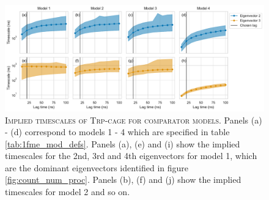 \documentclass{article}
\begin{document}
\begin{figure}[h]
    \centering
    \includegraphics[width=1\textwidth]{figures/model_comparision_its/2jof.pdf}
    \caption{\textsc{Implied timescales of Trp-cage for comparator models.} Panels (a) - (d) correspond to models 1 - 4 which are specified in table \ref{tab:1fme_mod_defs}. Panels (a), (e) and (i) show the implied timescales for the 2nd, 3rd and 4th eigenvectors for model 1, which are the dominant eigenvectors identified in figure \ref{fig:count_num_proc}.  Panels (b), (f) and (j) show the implied timescales for model 2 and so on.}
    \label{fig:2jof_its}
\end{figure}
\end{document}
